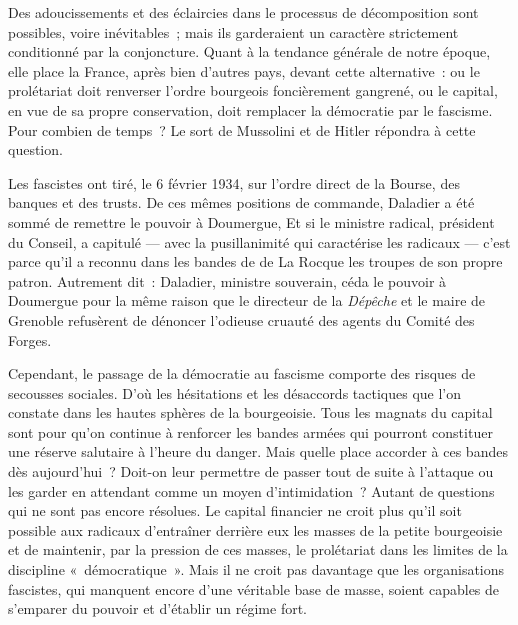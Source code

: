 \documentclass[french,twoside]{book} %
\begin{document}
Des adoucissements et des éclaircies dans le processus de décomposition sont possibles, voire inévitables ; mais ils garderaient un caractère strictement conditionné par la conjoncture. Quant à la tendance générale de notre époque, elle place la France, après bien d’autres pays, devant cette alternative : ou le prolétariat doit renverser l’ordre bourgeois foncièrement gangrené, ou le capital, en vue de sa propre conservation, doit remplacer la démocratie par le fascisme. Pour combien de temps ? Le sort de Mussolini et de Hitler répondra à cette question.\par
Les fascistes ont tiré, le 6 février 1934, sur l’ordre  direct de la Bourse, des banques et des trusts. De ces mêmes positions de commande, Daladier a été sommé de remettre le pouvoir à Doumergue, Et si le ministre radical, président du Conseil, a capitulé — avec la pusillanimité qui caractérise les radicaux — c’est parce qu’il a reconnu dans les bandes de de La Rocque les troupes de son propre patron. Autrement dit : Daladier, ministre souverain, céda le pouvoir à Doumergue pour la même raison que le directeur de la \emph{Dépêche} et le maire de Grenoble refusèrent de dénoncer l’odieuse cruauté des agents du Comité des Forges.\par
Cependant, le passage de la démocratie au fascisme comporte des risques de secousses sociales. D’où les hésitations et les désaccords tactiques que l’on constate dans les hautes sphères de la bourgeoisie. Tous les magnats du capital sont pour qu’on continue à renforcer les bandes armées qui pourront constituer une réserve salutaire à l’heure du danger. Mais quelle place accorder à ces bandes dès aujourd’hui ? Doit-on leur permettre de passer tout de suite à l’attaque ou les garder en attendant comme un moyen d’intimidation ? Autant de questions qui ne sont pas encore résolues. Le capital financier ne croit plus qu’il soit possible aux radicaux d’entraîner derrière eux les masses de la petite bourgeoisie et de maintenir, par la pression de ces masses, le prolétariat dans les limites de la discipline « démocratique ». Mais il ne croit pas davantage que les organisations fascistes, qui manquent encore d’une véritable base de masse, soient capables de s’emparer du pouvoir et d’établir un régime fort.\par
\end{document}
